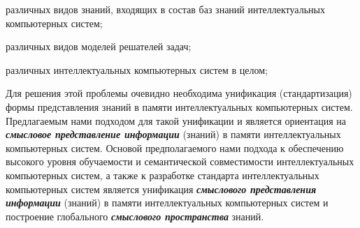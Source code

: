 \begin{scnsubstruct}
{        \begin{scnitemize}
            \item различных видов знаний, входящих в состав баз знаний интеллектуальных компьютерных систем;
            \item различных видов моделей решателей задач;
            \item различных интеллектуальных компьютерных систем в целом;
        \end{scnitemize}
        Для решения этой проблемы очевидно необходима унификация (стандартизация) формы представления знаний в памяти интеллектуальных компьютерных систем. Предлагаемым нами подходом для такой унификации и является ориентация на \textbf{\textit{смысловое представление информации}} (знаний) в памяти интеллектуальных компьютерных систем. Основой предполагаемого нами подхода к обеспечению высокого уровня обучаемости и семантической совместимости интеллектуальных компьютерных систем, а также к разработке стандарта интеллектуальных компьютерных систем является унификация \textbf{\textit{смыслового представления информации}} (знаний) в памяти интеллектуальных компьютерных систем и построение глобального \textbf{\textit{смыслового пространства}} знаний.}
        \begin{scnindent}
    	\end{scnindent}
    

\end{scnsubstruct}
